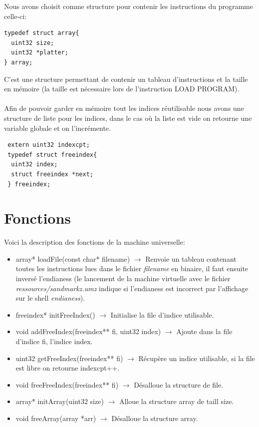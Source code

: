 \documentclass[a4paper,12pt]{report}
\begin{document}
Nous avons choisit comme structure pour contenir les instructions du programme celle-ci:
\begin{verbatim}
typedef struct array{
  uint32 size;
  uint32 *platter;
} array;
\end{verbatim}
C'est une structure permettant de contenir un tableau d'instructions et la taille en mémoire (la taille est nécessaire lors de
l'instruction LOAD PROGRAM).
\\ \\
Afin de pouvoir garder en mémoire tout les indices réutilisable nous avons une structure de liste pour les indices, dans le cas où
la liste est vide on retourne une variable globale et on l'incrémente.
\begin{verbatim}
 extern uint32 indexcpt;
 typedef struct freeindex{
  uint32 index;
  struct freeindex *next;
 } freeindex;
\end{verbatim}

\section{Fonctions}
Voici la description des fonctions de la machine universelle:
\begin{itemize}
 \item array* loadFile(const char* filename) $\rightarrow$ Renvoie un tableau contenant toutes les instructions lues dans le fichier
 \textit{filename} en binaire, il faut ensuite inversé l'endianess (le lancement de la machine virtuelle avec le fichier
 \textit{ressources/sandmarkz.umz} indique si l'endianess est incorrect par l'affichage sur le shell \textit{endianess}).
 \item freeindex* initFreeIndex() $\rightarrow$ Initialise la file d'indice utilisable.
 \item void addFreeIndex(freeindex** fi, uint32 index) $\rightarrow$ Ajoute dans la file d'indice fi, l'indice index.
 \item uint32 getFreeIndex(freeindex** fi) $\rightarrow$ Récupère un indice utilisable, si la file est libre on retourne indexcpt++.
 \item void freeFreeIndex(freeindex** fi) $\rightarrow$ Désalloue la structure de file.
 \item array* initArray(uint32 size) $\rightarrow$ Alloue la structure array de taill size.
 \item void freeArray(array *arr) $\rightarrow$ Désalloue la structure array.
\end{itemize}
\end{document}
